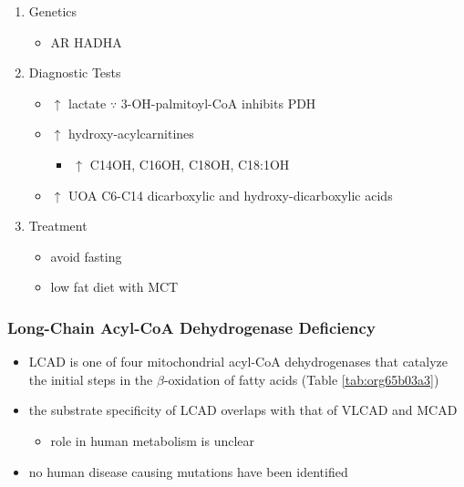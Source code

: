 \documentclass[12pt]{scrartcl}
\begin{document}
\begin{enumerate}
\item Genetics
\label{sec:orgf9fcc94}
\begin{itemize}
\item AR HADHA
\end{itemize}

\item Diagnostic Tests
\label{sec:orgc9b55fb}
\begin{itemize}
\item \(\uparrow\) lactate \(\because\) 3-OH-palmitoyl-CoA inhibits PDH
\item \(\uparrow\) hydroxy-acylcarnitines
\begin{itemize}
\item \(\uparrow\) C14OH, C16OH, C18OH, C18:1OH
\end{itemize}
\item \(\uparrow\) UOA C6-C14 dicarboxylic and hydroxy-dicarboxylic acids
\end{itemize}

\item Treatment
\label{sec:orgf70f1de}
\begin{itemize}
\item avoid fasting
\item low fat diet with MCT
\end{itemize}
\end{enumerate}
\subsubsection{Long-Chain Acyl-CoA Dehydrogenase Deficiency}
\label{sec:orgc8ae7cd}
\begin{itemize}
\item LCAD is one of four mitochondrial acyl-CoA dehydrogenases that
catalyze the initial steps in the \(\beta\)-oxidation of fatty acids
(Table \ref{tab:org65b03a3})
\item the substrate specificity of LCAD overlaps with that of
VLCAD and MCAD
\begin{itemize}
\item role  in  human  metabolism  is unclear
\end{itemize}
\item no human disease causing mutations have been identified
\end{itemize}
\end{document}

